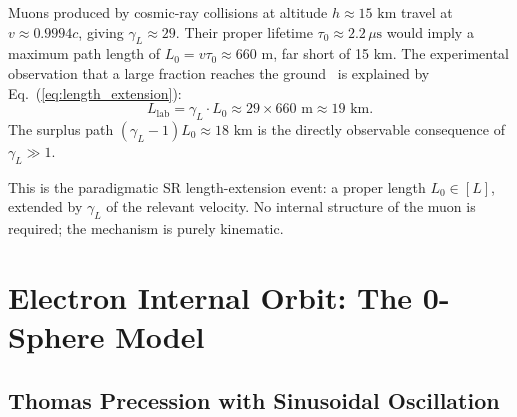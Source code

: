 \documentclass[%
 reprint, amsmath,amssymb, aps, prb, ]{revtex4-2}
\numberwithin{equation}{section}
\newcommand{\gammaL}{\gamma_{L}}
\begin{document}
Muons produced by cosmic-ray collisions at altitude $h \approx 15\text{ km}$ travel at $v \approx 0.9994c$, giving $\gammaL \approx 29$. Their proper lifetime $\tau_0 \approx 2.2\,\mu\text{s}$ would imply a maximum path length of $L_0 = v\tau_0 \approx 660\text{ m}$, far short of 15 km. The experimental observation that a large fraction reaches the ground~\cite{Bailey1977} is explained by Eq.~(\ref{eq:length_extension}):
\begin{equation}
L_{\text{lab}} = \gammaL \cdot L_0 \approx 29 \times 660\text{ m} \approx 19\text{ km}.
\label{eq:muon_path}
\end{equation}
The surplus path $(\gammaL - 1)L_0 \approx 18\text{ km}$ is the directly observable consequence of $\gammaL \gg 1$.

This is the paradigmatic SR length-extension event: a proper length $L_0 \in [L]$, extended by $\gammaL$ of the relevant velocity. No internal structure of the muon is required; the mechanism is purely kinematic.

\section{\label{sec:0sphere}Electron Internal Orbit: The 0-Sphere Model}

\subsection{\label{sec:thomas}Thomas Precession with Sinusoidal Oscillation}
\end{document}
